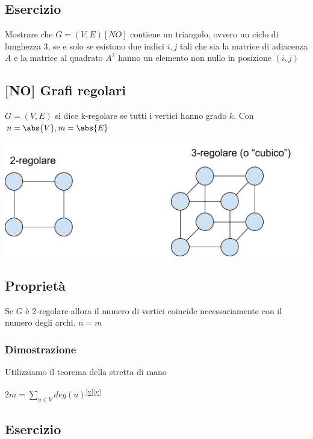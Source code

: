 \documentclass{article}
\begin{document}
{{\subsection{Esercizio}

{Mostrare che $G=(V,E) [NO]$ contiene un triangolo, ovvero un ciclo di lunghezza 3, se e solo se esistono due indici $i,j$ tali che sia la matrice di adiacenza $A$ e la matrice al quadrato $A^2$ hanno un elemento non nullo in posizione $(i,j)$}

\hypertarget{h.m8b6lpkoqj6x}{\subsection{\texorpdfstring{{{[}NO{]} Grafi regolari}}{{[}NO{]} Grafi regolari}}\label{h.m8b6lpkoqj6x}}

{$G=(V,E)$ si dice k-regolare se tutti i vertici hanno grado $k$. Con $n=\abs{V},m=\abs{E}$}

{\includegraphics{images/image524.png}}

\subsection{Proprietà}

{Se $G$ è 2-regolare allora il numero di vertici coincide necessariamente con il numero degli archi. $n=m$}

\subsubsection{Dimostrazione}

{Utilizziamo il teorema della stretta di mano}

$2m=\sum_{u\in V}{deg(u)}$\textsuperscript{\protect\hyperlink{cmnt24}{{[}x{]}}\protect\hyperlink{cmnt25}{{[}y{]}}}

\subsection{Esercizio}

}}
\end{document}
